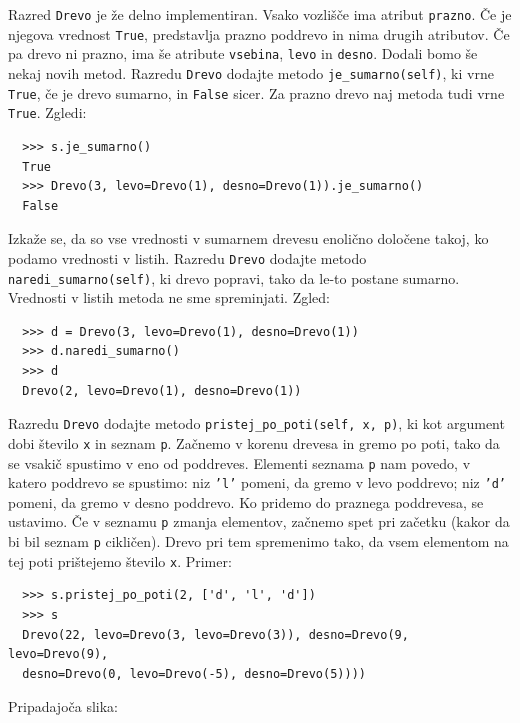 \documentclass[arhiv]{../izpit}
\begin{document}
Razred \texttt{Drevo} je že delno implementiran. Vsako vozlišče ima atribut \texttt{prazno}. Če je njegova vrednost \texttt{True}, predstavlja prazno poddrevo in nima drugih atributov. Če pa drevo ni prazno, ima še atribute \texttt{vsebina}, \texttt{levo} in \texttt{desno}. Dodali bomo še nekaj novih metod.
%
\podnaloga[10 točk]
%
Razredu \texttt{Drevo} dodajte metodo \texttt{je\_sumarno(self)}, ki vrne \texttt{True}, če je drevo sumarno, in \texttt{False} sicer. Za prazno drevo naj metoda tudi vrne \texttt{True}.
Zgledi:
%
\begin{verbatim}
  >>> s.je_sumarno()
  True
  >>> Drevo(3, levo=Drevo(1), desno=Drevo(1)).je_sumarno()
  False
\end{verbatim}
%
\podnaloga[10 točk]
%
Izkaže se, da so vse vrednosti v sumarnem drevesu enolično določene takoj, ko podamo vrednosti v listih. Razredu \texttt{Drevo} dodajte metodo \texttt{naredi\_sumarno(self)}, ki drevo popravi, tako da le-to postane sumarno. Vrednosti v listih metoda ne sme spreminjati. Zgled:
%
\begin{verbatim}
  >>> d = Drevo(3, levo=Drevo(1), desno=Drevo(1))
  >>> d.naredi_sumarno()
  >>> d
  Drevo(2, levo=Drevo(1), desno=Drevo(1))
\end{verbatim}
%

\podnaloga[10 točk]
%
Razredu \texttt{Drevo} dodajte metodo \texttt{pristej\_po\_poti(self, x, p)}, ki kot argument dobi število \texttt{x} in seznam \texttt{p}. Začnemo v korenu drevesa in gremo po poti, tako da se vsakič spustimo v eno od poddreves. Elementi seznama \texttt{p} nam povedo, v katero poddrevo se spustimo: niz \texttt{'l'} pomeni, da gremo v levo poddrevo; niz \texttt{'d'} pomeni, da gremo v desno poddrevo. Ko pridemo do praznega poddrevesa, se ustavimo. Če v seznamu \texttt{p} zmanja elementov, začnemo spet pri začetku (kakor da bi bil seznam \texttt{p} cikličen). Drevo pri tem spremenimo tako, da vsem elementom na tej poti prištejemo število \texttt{x}. Primer:
\begin{verbatim}
  >>> s.pristej_po_poti(2, ['d', 'l', 'd'])
  >>> s
  Drevo(22, levo=Drevo(3, levo=Drevo(3)), desno=Drevo(9, levo=Drevo(9),
  desno=Drevo(0, levo=Drevo(-5), desno=Drevo(5))))
\end{verbatim}

\noindent Pripadajoča slika:
\vspace{-0.4cm}
\begin{center}
\end{center}
\end{document}
